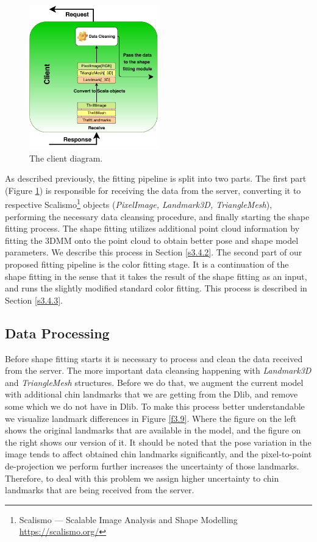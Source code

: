 \begin{figure}
  \centering
  \includegraphics[width=0.5\textwidth]{Figures/Client.pdf}
  \caption{The client diagram.}
  \label{client}
\end{figure}

As described previously, the fitting pipeline is split into two parts. The first part (Figure \ref{client}) is responsible for receiving the data from the server, converting it to respective Scalismo\footnote{Scalismo — Scalable Image Analysis and Shape Modelling \url{https://scalismo.org/}} objects (\textit{PixelImage, Landmark3D, TriangleMesh}), performing the necessary data cleansing procedure, and finally starting the shape fitting process. The shape fitting utilizes additional point cloud information by fitting the 3DMM onto the point cloud to obtain better pose and shape model parameters. We describe this process in Section \ref{s3.4.2}.  The second part of our proposed fitting pipeline is the color fitting stage. It is a continuation of the shape fitting in the sense that it takes the result of the shape fitting as an input, and runs the slightly modified standard color fitting. This process is described in Section \ref{s3.4.3}.

\subsection{Data Processing}\label{s3.4.1}
Before shape fitting starts it is necessary to process and clean the data received from the server. The more important data cleansing happening with \textit{Landmark3D} and \textit{TriangleMesh} structures. Before we do that, we augment the current model with additional chin landmarks that we are getting from the Dlib, and remove some which we do not have in Dlib. To make this process better understandable we visualize landmark differences in Figure \ref{f3.9}. Where the figure on the left shows the original landmarks that are available in the model, and the figure on the right shows our version of it. It should be noted that the pose variation in the image tends to affect obtained chin landmarks significantly, and the pixel-to-point de-projection we perform further increases the uncertainty of those landmarks. Therefore, to deal with this problem we assign higher uncertainty to chin landmarks that are being received from the server. 

